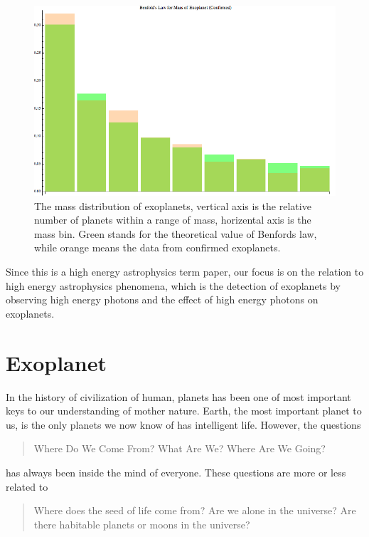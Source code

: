 \documentclass[12pt]{article}
\begin{document}
\begin{figure}
\centering
\includegraphics[width=\textwidth]{./assets/barConMvB}
\caption{The mass distribution of exoplanets, vertical axis is the relative number of planets within a range of mass, horizental axis is the mass bin. Green stands for the theoretical value of Benfords law, while orange means the data from confirmed exoplanets.}
\label{fig:benfordslaw}
\end{figure}


Since this is a high energy astrophysics term paper, our focus is on the relation to high energy astrophysics phenomena, which is the detection of exoplanets by observing high energy photons and the effect of high energy photons on exoplanets.




\section*{Exoplanet}

In the history of civilization of human, planets has been one of most important keys to our understanding of mother nature. Earth, the most important planet to us, is the only planets we now know of has intelligent life. However, the questions

\begin{quote}
Where Do We Come From? What Are We? Where Are We Going?
\end{quote}

has always been inside the mind of everyone. These questions are more or less related to

\begin{quote}
Where does the seed of life come from? Are we alone in the universe? Are there habitable planets or moons in the universe?
\end{quote}
\end{document}
